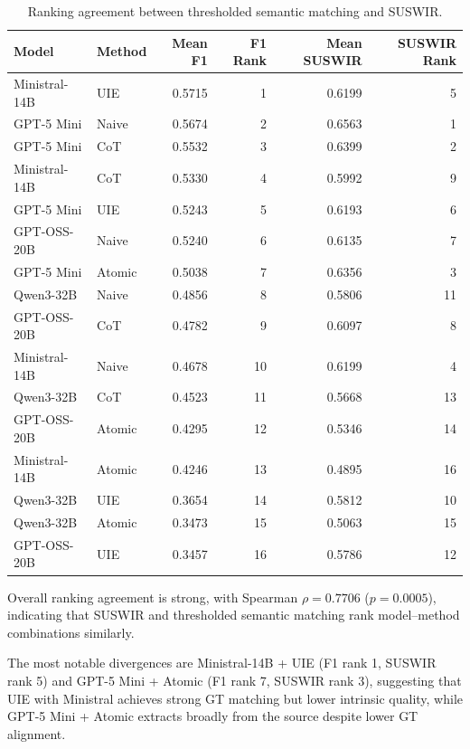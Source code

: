 \begin{table}[htbp]
	\centering
	\caption{Ranking agreement between thresholded semantic matching and SUSWIR.}
	\label{tab:suswir_vs_thresholded}
	\begin{tabular}{llrrrr}
		\toprule
		\textbf{Model} & \textbf{Method} & \textbf{Mean F1} & \textbf{F1 Rank} & \textbf{Mean SUSWIR} & \textbf{SUSWIR Rank} \\
		\midrule
		Ministral-14B & UIE   & 0.5715 & 1  & 0.6199 & 5  \\
		GPT-5 Mini    & Naive & 0.5674 & 2  & 0.6563 & 1  \\
		GPT-5 Mini    & CoT   & 0.5532 & 3  & 0.6399 & 2  \\
		Ministral-14B & CoT   & 0.5330 & 4  & 0.5992 & 9  \\
		GPT-5 Mini    & UIE   & 0.5243 & 5  & 0.6193 & 6  \\
		GPT-OSS-20B   & Naive & 0.5240 & 6  & 0.6135 & 7  \\
		GPT-5 Mini    & Atomic & 0.5038 & 7  & 0.6356 & 3  \\
		Qwen3-32B     & Naive & 0.4856 & 8  & 0.5806 & 11 \\
		GPT-OSS-20B   & CoT   & 0.4782 & 9  & 0.6097 & 8  \\
		Ministral-14B & Naive & 0.4678 & 10 & 0.6199 & 4  \\
		Qwen3-32B     & CoT   & 0.4523 & 11 & 0.5668 & 13 \\
		GPT-OSS-20B   & Atomic & 0.4295 & 12 & 0.5346 & 14 \\
		Ministral-14B & Atomic & 0.4246 & 13 & 0.4895 & 16 \\
		Qwen3-32B     & UIE   & 0.3654 & 14 & 0.5812 & 10 \\
		Qwen3-32B     & Atomic & 0.3473 & 15 & 0.5063 & 15 \\
		GPT-OSS-20B   & UIE   & 0.3457 & 16 & 0.5786 & 12 \\
		\bottomrule
	\end{tabular}
\end{table}

Overall ranking agreement is strong, with Spearman $\rho = 0.7706$ ($p = 0.0005$), indicating that SUSWIR and thresholded semantic matching rank model--method combinations similarly.

The most notable divergences are Ministral-14B + UIE (F1 rank 1, SUSWIR rank 5) and GPT-5 Mini + Atomic (F1 rank 7, SUSWIR rank 3), suggesting that UIE with Ministral achieves strong GT matching but lower intrinsic quality, while GPT-5 Mini + Atomic extracts broadly from the source despite lower GT alignment.

